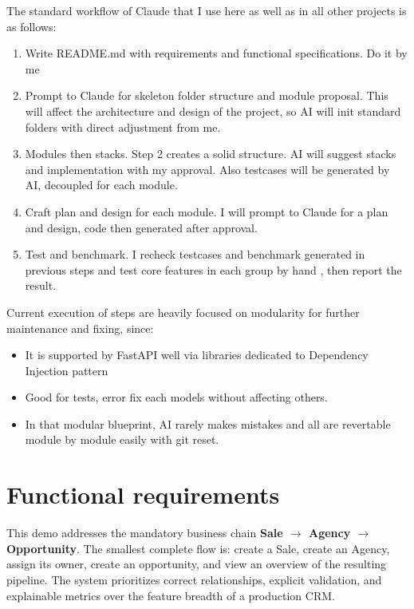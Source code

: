 \documentclass[13pt, a4paper]{article}
\begin{document}
The standard workflow of Claude that I use here as well as in all other projects is as follows:
\begin{enumerate}
    \item Write README.md with requirements and functional specifications. Do it by me
    \item Prompt to Claude for skeleton folder structure and module proposal. This will affect the architecture and design of the 
    project, so AI will init standard folders with direct adjustment from me.
    \item Modules then stacks. Step 2 creates a solid structure. AI will suggest stacks and implementation with my approval. Also
    testcases will be generated by AI, decoupled for each module.
    \item Craft plan and design for each module. I will prompt to Claude for a plan and design, code then generated after approval.
    \item Test and benchmark. I recheck testcases and benchmark generated in previous steps and test core features in each group by hand
    , then report the result.
\end{enumerate}
Current execution of steps are heavily focused on modularity for further maintenance and fixing, since:
\begin{itemize}
    \item It is supported by FastAPI well via libraries dedicated to Dependency Injection pattern
    \item Good for tests, error fix each models without affecting others.
    \item In that modular blueprint, AI rarely makes mistakes and all are revertable module by module easily with git reset.
\end{itemize}

\section{Functional requirements}

This demo addresses the mandatory business chain \textbf{Sale $\rightarrow$ Agency $\rightarrow$
Opportunity}. The smallest complete flow is: create a Sale, create an Agency, assign its
owner, create an opportunity, and view an overview of the resulting pipeline. The system
prioritizes correct relationships, explicit validation, and explainable metrics over the
feature breadth of a production CRM.
\end{document}
